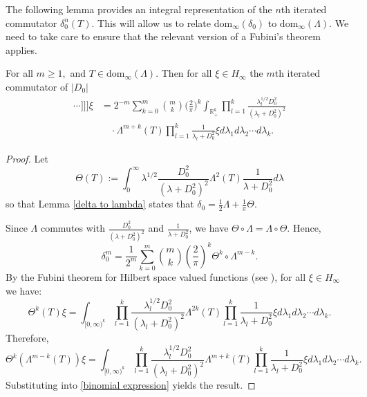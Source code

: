     The following lemma provides an integral representation of the $n$th iterated commutator $\delta_0^n(T)$. This will allow
    us to relate $\mathrm{dom}_\infty(\delta_0)$ to $\mathrm{dom}_\infty(\Lambda)$. 
    We need to take care to ensure that the relevant version of a Fubini's theorem applies.
    \begin{lem}\label{delta to lambda power} 
        For all $m\geq1,$ and $T \in \mathrm{dom}_\infty(\Lambda)$. Then for all $\xi \in H_\infty$ the $m$th iterated commutator of $|D_0|$ 
        \begin{align*}
            [|D_0|,[|D_0|,[\cdots[|D_0|,T]\cdots]]]\xi &= 2^{-m}\sum_{k=0}^m\binom{m}{k}\Big(\frac{2}{\pi}\Big)^k\int_{\mathbb{R}^k_+}\prod_{l=1}^k\frac{\lambda_l^{1/2}D_0^2}{(\lambda_l+D_0^2)^2}\\
                                                       &\quad \cdot \Lambda^{m+k}(T)\prod_{l=1}^k\frac{1}{\lambda_l+D_0^2}\xi d\lambda_1 d\lambda_2\cdots d\lambda_k.
        \end{align*}
    \end{lem}
    \begin{proof} 
        Let
        \begin{equation*}
            \Theta(T) := \int_0^\infty \lambda^{1/2} \frac{D_0^2}{(\lambda+D_0^2)^2} \Lambda^2(T)\frac{1}{\lambda+D_0^2}d\lambda
        \end{equation*}
        so that Lemma \ref{delta to lambda} states that $\delta_0 = \frac{1}{2}\Lambda+\frac{1}{\pi}\Theta$. 
        
        Since $\Lambda$ commutes with $\frac{D_0^2}{(\lambda+D_0^2)^2}$ and $\frac{1}{\lambda+D_0^2}$, we have $\Theta\circ\Lambda = \Lambda\circ \Theta$. Hence,
        \begin{equation}\label{binomial expression}
            \delta_0^m = \frac{1}{2^m}\sum_{k=0}^m \binom{m}{k} \left(\frac{2}{\pi}\right)^k\Theta^k\circ \Lambda^{m-k}.
        \end{equation}
        By the Fubini theorem { for Hilbert space valued functions (see \cite[Theorem III.11.13]{Dunford-Schwartz-1}), for all $\xi \in H_\infty$} we have:
        \begin{equation*}
            \Theta^k(T)\xi = \int_{[0,\infty)^k} \prod_{l=1}^k \frac{\lambda_l^{1/2}D_0^2}{(\lambda_l+D_0^2)^2}\Lambda^{2k}(T)\prod_{l=1}^k \frac{1}{\lambda_l+D_0^2}\xi d\lambda_1d\lambda_2\cdots d\lambda_k.
        \end{equation*}
        Therefore,
        \begin{equation*}
            \Theta^k(\Lambda^{m-k}(T))\xi = \int_{[0,\infty)^k} \prod_{l=1}^k \frac{\lambda_l^{1/2}D_0^2}{(\lambda_l+D_0^2)^2}\Lambda^{m+k}(T)\prod_{l=1}^k \frac{1}{\lambda_l+D_0^2}\xi d\lambda_1d\lambda_2\cdots d\lambda_k.
        \end{equation*}
        Substituting into \eqref{binomial expression} yields the result.
    \end{proof}
    
